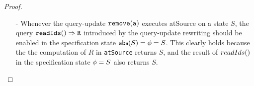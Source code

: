\begin {proof}
\begin{itemize}
\begin{itemize}
    Let us prove $S' = \abstate'$ by contradiction.

        \begin{itemize}
        \setlength{\itemsep}{0.5pt}
        \item[-] If there exists item $(c,V'')$ in $\abstate'$ but not in $S'$: we can see that $(c,V'') \in S$, $(c,V'') \notin S_1$, and $(c,V'') \in S_2$.

        Let $\alabel_c$ be the operation that generates effector $(c,V'')$. Since $(c,V'') \in S_2$, by $fact1$, we can see that, $(\alabel_c,\alabel) \in \avisord$. Since $(c,V'') \notin S_1$, we know that there exists a {\tt write} operation $\alabel_1$, such that $(\alabel_c,\alabel_1)$, $(\alabel_1,\alabel) \in \avisord$. Assume the effector of $\alabel_1$ is $(a_1,V_1)$. By $fact1$, we can see that, $V'' < V_1$.

        Since $(\alabel_1,\alabel) \in \avisord$ and $\alinord$ is consistent with the visibility relation, we can see that, $\alabel_1 = \alabel''_i$ for some $i \leq m$. Since $(c,V'') \in S$, we can see that the effector of $\alabel_1$ has not been applied yet in $S$. This contradicts the assumption that, $S$ is obtained from the initial replica state by applying effectors of $\alabel''_1,\ldots,\alabel''_m$ and $\alabel_1 = \alabel''_i$ for some $i \leq m$.



        \item[-] If there exists item $(c,V'')$ in $S'$ but not in $\abstate'$: we can see that $(c,V'') \in S$, $(c,V'') \notin S_2$, and $(c,V'') \in S_1$.

        Let $\alabel_c$ be the operation that generates effector $(c,V'')$. Since $(c,V'') \notin S_2$, we know that $\neg(V'' < V')$. Since $(c,V'') \in S_1$, we know that $(\alabel_c,\alabel) \in \avisord$. This contradicts $fact1$.
        \end{itemize}

    Therefore, we know that $S' = \abstate'$, and the case of the effector $(a,V')$ and the $\alabelshort[{\tt write}]{a,V',S_1}$ operation of the specification $\specMVReg$ holds.

    \item[-] Whenever the query-update $\alabelshort[{\tt remove}]{a}$ executes atSource on a state $S$, the query $\alabellong[{\tt readIds}]{}{R}{}$ introduced by the query-update rewriting should be enabled in the specification state $\refmap(S)=\abstate=S$. This clearly holds because the the computation of $R$ in {\tt atSource} returns $S$, and the result of $\alabelshort[readIds]{}$ in the specification state $\abstate = S$ also returns $S$.


\end{itemize}
\end{itemize}
\end{proof}
